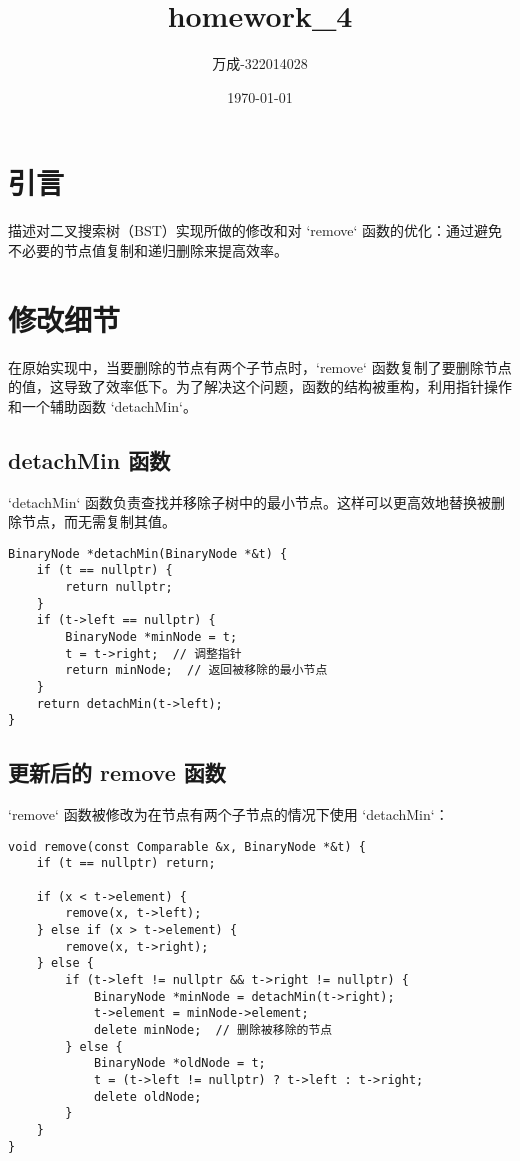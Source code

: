 \documentclass{article}
\title{homework_4}
\author{万成-322014028}
\date{\today}
\begin{document}
\maketitle

\section{引言}
描述对二叉搜索树（BST）实现所做的修改和对 `remove` 函数的优化：通过避免不必要的节点值复制和递归删除来提高效率。

\section{修改细节}
在原始实现中，当要删除的节点有两个子节点时，`remove` 函数复制了要删除节点的值，这导致了效率低下。为了解决这个问题，函数的结构被重构，利用指针操作和一个辅助函数 `detachMin`。

\subsection{detachMin 函数}
`detachMin` 函数负责查找并移除子树中的最小节点。这样可以更高效地替换被删除节点，而无需复制其值。

\begin{verbatim}
BinaryNode *detachMin(BinaryNode *&t) {
    if (t == nullptr) {
        return nullptr;
    }
    if (t->left == nullptr) {
        BinaryNode *minNode = t;
        t = t->right;  // 调整指针
        return minNode;  // 返回被移除的最小节点
    }
    return detachMin(t->left);
}
\end{verbatim}

\subsection{更新后的 remove 函数}
`remove` 函数被修改为在节点有两个子节点的情况下使用 `detachMin`：

\begin{verbatim}
void remove(const Comparable &x, BinaryNode *&t) {
    if (t == nullptr) return;

    if (x < t->element) {
        remove(x, t->left);
    } else if (x > t->element) {
        remove(x, t->right);
    } else {
        if (t->left != nullptr && t->right != nullptr) {
            BinaryNode *minNode = detachMin(t->right);
            t->element = minNode->element;
            delete minNode;  // 删除被移除的节点
        } else {
            BinaryNode *oldNode = t;
            t = (t->left != nullptr) ? t->left : t->right;
            delete oldNode;
        }
    }
}
\end{verbatim}
\end{document}
